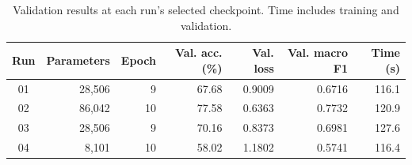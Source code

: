 \begin{table}[htbp]\centering\small
\caption{Validation results at each run's selected checkpoint. Time includes training and validation.}
\begin{tabular}{@{}crrrrrr@{}}\toprule
Run & Parameters & Epoch & Val. acc. (\%) & Val. loss & Val. macro F1 & Time (s)\\\midrule
01 & 28,506 & 9 & 67.68 & 0.9009 & 0.6716 & 116.1\\
02 & 86,042 & 10 & 77.58 & 0.6363 & 0.7732 & 120.9\\
03 & 28,506 & 9 & 70.16 & 0.8373 & 0.6981 & 127.6\\
04 & 8,101 & 10 & 58.02 & 1.1802 & 0.5741 & 116.4\\
\bottomrule\end{tabular}\end{table}
